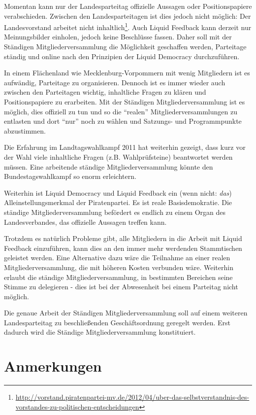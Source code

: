Momentan kann nur der Landesparteitag offizielle Aussagen oder Positionspapiere verabschieden. Zwischen den Landesparteitagen ist dies jedoch nicht möglich: Der Landesvorstand arbeitet nicht inhaltlich\footnote{\url{http://vorstand.piratenpartei-mv.de/2012/04/uber-das-selbstverstandnis-des-vorstandes-zu-politischen-entscheidungen}}. Auch Liquid Feedback kann derzeit nur Meinungsbilder einholen, jedoch keine Beschlüsse fassen. Daher soll mit der Ständigen Mitgliederversammlung die Möglichkeit geschaffen werden, Parteitage ständig und online nach den Prinzipien der Liquid Democracy durchzuführen.

In einem Flächenland wie Mecklenburg-Vorpommern mit wenig Mitgliedern ist es aufwändig, Parteitage zu organisieren. Dennoch ist es immer wieder auch zwischen den Parteitagen wichtig, inhaltliche Fragen zu klären und Positionspapiere zu erarbeiten. Mit der Ständigen Mitgliederversammlung ist es möglich, dies offiziell zu tun und so die ``realen'' Mitgliederversammlungen zu entlasten und dort ``nur'' noch zu wählen und Satzungs- und Programmpunkte abzustimmen.

Die Erfahrung im Landtagswahlkampf 2011 hat weiterhin gezeigt, dass kurz vor der Wahl viele inhaltliche Fragen (z.B. Wahlprüfsteine) beantwortet werden müssen. Eine arbeitende ständige Mitgliederversammlung könnte den Bundestagswahlkampf so enorm erleichtern.

Weiterhin ist Liquid Democracy und Liquid Feedback ein (wenn nicht: \emph{das}) Alleinstellungsmerkmal der Piratenpartei. Es ist reale Basisdemokratie. Die ständige Mitgliederversammlung befördert es endlich zu einem Organ des Landesverbandes, das offizielle Aussagen treffen kann.

Trotzdem es natürlich Probleme gibt, alle Mitgliedern in die Arbeit mit Liquid Feedback einzuführen, kann dies an den immer mehr werdenden Stammtischen geleistet werden. Eine Alternative dazu wäre die Teilnahme an einer realen Mitgliederversammlung, die mit höheren Kosten verbunden wäre. Weiterhin erlaubt die ständige Mitgliederversammlung, in bestimmten Bereichen seine Stimme zu delegieren - dies ist bei der Abwesenheit bei einem Parteitag nicht möglich.

Die genaue Arbeit der Ständigen Mitgliederversammlung soll auf einem weiteren Landesparteitag zu beschließenden Geschäftsordnung geregelt werden. Erst dadurch wird die Ständige Mitgliederversammlung konstituiert.

\section{Anmerkungen}

